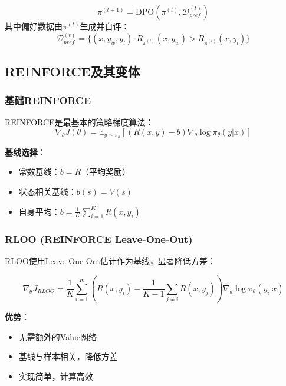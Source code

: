 \documentclass[12pt,a4paper]{article}
\begin{document}
\begin{equation}
\pi^{(t+1)} = \text{DPO}(\pi^{(t)}, \mathcal{D}_{pref}^{(t)})
\end{equation}
其中偏好数据由$\pi^{(t)}$生成并自评：
\begin{equation}
\mathcal{D}_{pref}^{(t)} = \{(x, y_w, y_l) : R_{\pi^{(t)}}(x, y_w) > R_{\pi^{(t)}}(x, y_l)\}
\end{equation}

\subsection{REINFORCE及其变体}

\subsubsection{基础REINFORCE}

REINFORCE是最基本的策略梯度算法：
\begin{equation}
\nabla_\theta J(\theta) = \mathbb{E}_{y \sim \pi_\theta}[(R(x,y) - b) \nabla_\theta \log \pi_\theta(y|x)]
\end{equation}

\textbf{基线选择}：
\begin{itemize}
    \item 常数基线：$b = \bar{R}$（平均奖励）
    \item 状态相关基线：$b(s) = V(s)$
    \item 自身平均：$b = \frac{1}{K}\sum_{i=1}^K R(x, y_i)$
\end{itemize}

\subsubsection{RLOO (REINFORCE Leave-One-Out)}

RLOO使用Leave-One-Out估计作为基线，显著降低方差：

\begin{equation}
\nabla_\theta J_{RLOO} = \frac{1}{K}\sum_{i=1}^{K}\left(R(x, y_i) - \frac{1}{K-1}\sum_{j \neq i}R(x, y_j)\right)\nabla_\theta \log \pi_\theta(y_i|x)
\end{equation}

\textbf{优势}：
\begin{itemize}
    \item 无需额外的Value网络
    \item 基线与样本相关，降低方差
    \item 实现简单，计算高效
\end{itemize}
\end{document}
